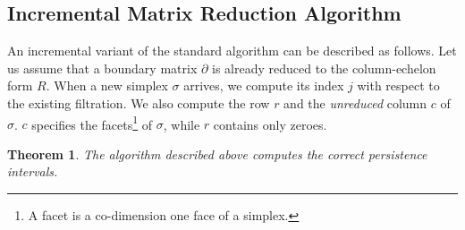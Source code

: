 \documentclass[11pt]{article}
\newtheorem{theorem}{Theorem}[section]
\begin{document}
\subsection{Incremental Matrix Reduction Algorithm}

An incremental variant of the standard algorithm can be described as follows.  Let us assume that a 
boundary matrix $\partial$ is already reduced to the column-echelon form $R$.  When a new simplex 
$\sigma$ arrives, we compute its index $j$ with respect to the existing filtration.  We also 
compute the row $r$ and the \emph{unreduced} column $c$ of $\sigma$. $c$ specifies the 
facets\footnote{A facet is a co-dimension one face of a simplex.} of $\sigma$, while $r$ contains 
only zeroes.

\begin{theorem}
	The algorithm described above computes the correct persistence intervals.
\end{theorem}
\end{document}
